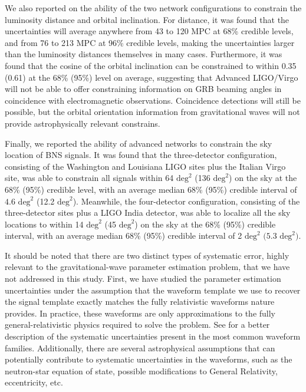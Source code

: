 \documentclass[11pt,a4paper]{emulateapj} 
\begin{document}
 
We also reported on the ability of the two network configurations to
constrain the luminosity distance and orbital inclination.  For
distance, it was found that the uncertainties will average anywhere from
43 to 120 MPC at 68\% credible levels, and from 76 to 213 MPC at 96\% credible levels,
 making the uncertainties 
larger than the luminosity distances themselves in many cases.  Furthermore, it was
found that the cosine of the orbital inclination can be constrained to
within 0.35 (0.61) at the 68\% (95\%) level on average,
 suggesting that Advanced LIGO/Virgo will not
be able to offer constraining information on GRB beaming angles in coincidence
with electromagnetic observations.  Coincidence detections will still be possible, but
the orbital orientation information from gravitational waves will 
not provide astrophysically relevant constrains.


Finally, we reported the ability of advanced networks to constrain the
sky location of BNS signals.  It was found that the three-detector
configuration, consisting of the Washington and Louisiana LIGO sites
plus the Italian Virgo site, was able to constrain all signals within
64 $\mathrm{deg}^2$ (136 $\mathrm{deg}^2$) on the sky at the 68\% (95\%) 
credible level, with
an average median 68\% (95\%) credible interval of 
$4.6$ $\mathrm{deg}^2$ (12.2 $\mathrm{deg}^2$).
Meanwhile, the four-detector configuration, consisting of the
three-detector sites plus a LIGO India detector, was able to localize
all the sky locations to within 14 $\mathrm{deg}^2$ (45 $\mathrm{deg}^2$) on the sky at the 68\% (95\%)
credible interval, with an average median 68\% (95\%) credible interval of 
2 $\mathrm{deg}^2$ $(5.3$ $\mathrm{deg}^2)$.

It should be noted that there are two distinct types of systematic
error, highly relevant to the gravitational-wave parameter estimation
problem, that we have not addressed in this study.  First, we have
studied the parameter estimation uncertainties under the assumption
that the waveform template we use to recover the signal template
exactly matches the fully relativistic waveforms nature provides.  In
practice, these waveforms are only approximations to the fully
general-relativistic physics required to solve the problem.  See
\cite{BuonannoWaveform} for a better description of the systematic uncertainties
present in the most common waveform families.  Additionally, there are
several astrophysical assumptions that can potentially contribute to
systematic uncertainties in the waveforms, such as the neutron-star
equation of state, possible modifications to General Relativity,
eccentricity, etc.
\end{document}
